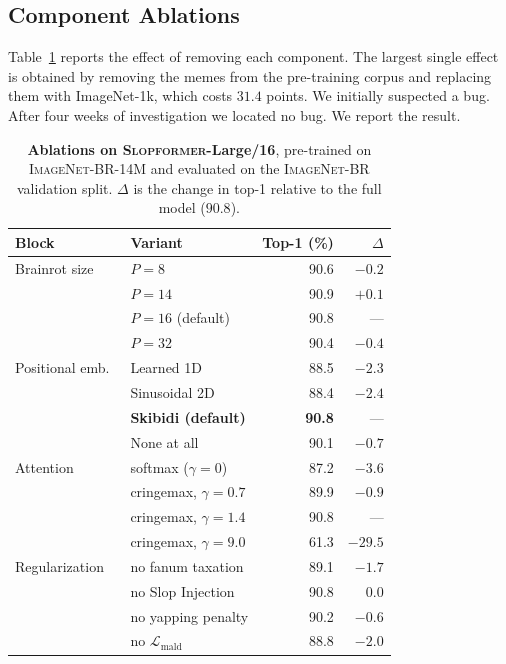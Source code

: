 \documentclass[10pt]{article}
\newcommand{\slop}{\textsc{Slopformer}}
\newcommand{\br}{\textsc{ImageNet-BR}}
\begin{document}
\subsection{Component Ablations}

Table~\ref{tab:ablation} reports the effect of removing each component. The
largest single effect is obtained by removing the memes from the pre-training
corpus and replacing them with ImageNet-1k, which costs $31.4$ points. We
initially suspected a bug. After four weeks of investigation we located no bug.
We report the result.

\begin{table}[t]
\centering
\caption{\textbf{Ablations on \slop{}-Large/16}, pre-trained on \br{}-14M and
evaluated on the \br{} validation split. $\Delta$ is the change in top-1
relative to the full model ($90.8$).}
\label{tab:ablation}
\small
\begin{tabular}{llrr}
\toprule
Block & Variant & Top-1 (\%) & $\Delta$ \\
\midrule
Brainrot size  & $P=8$   & 90.6 & $-0.2$ \\
               & $P=14$  & 90.9 & $+0.1$ \\
               & $P=16$ (default) & 90.8 & --- \\
               & $P=32$  & 90.4 & $-0.4$ \\
\midrule
Positional emb.\ & Learned 1D              & 88.5 & $-2.3$ \\
                 & Sinusoidal 2D           & 88.4 & $-2.4$ \\
                 & \textbf{Skibidi (default)} & \textbf{90.8} & --- \\
                 & None at all             & 90.1 & $-0.7$ \\
\midrule
Attention        & softmax ($\gamma=0$)    & 87.2 & $-3.6$ \\
                 & cringemax, $\gamma=0.7$ & 89.9 & $-0.9$ \\
                 & cringemax, $\gamma=1.4$ & 90.8 & --- \\
                 & cringemax, $\gamma=9.0$ & 61.3 & $-29.5$ \\
\midrule
Regularization   & no fanum taxation       & 89.1 & $-1.7$ \\
                 & no Slop Injection       & 90.8 & $\ \ 0.0$ \\
                 & no yapping penalty      & 90.2 & $-0.6$ \\
                 & no $\mathcal{L}_{\text{mald}}$ & 88.8 & $-2.0$ \\

\end{tabular}
\end{table}
\end{document}
